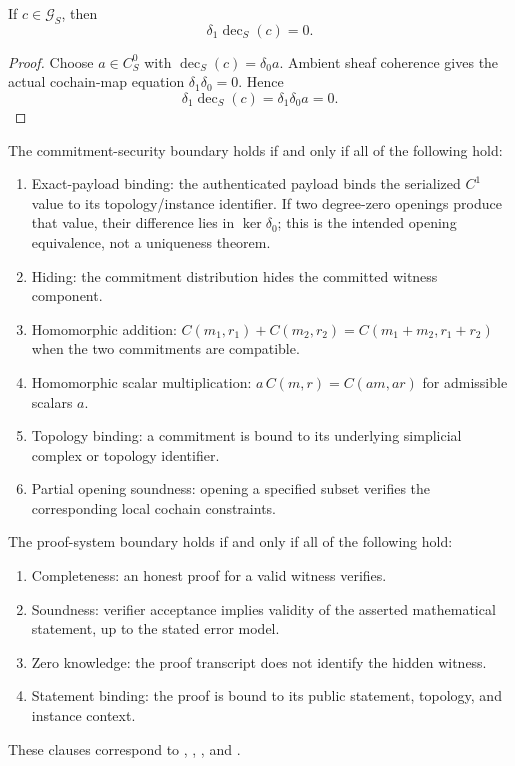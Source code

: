 \begin{proposition}
\label{prop:committed-exact-cochains-are-cocycles}
  If \(c\in\mathcal G_S\), then
  \[
    \delta_1\operatorname{dec}_S(c)=0.
  \]
\end{proposition}

\begin{proof}
  Choose \(a\in C_S^0\) with
  \(\operatorname{dec}_S(c)=\delta_0a\).  Ambient sheaf coherence gives the
  actual cochain-map equation \(\delta_1\delta_0=0\).  Hence
  \[
    \delta_1\operatorname{dec}_S(c)
    =\delta_1\delta_0a
    =0.
  \]
\end{proof}

\begin{definition}\label{def:proof-commitment-assumption-boundary}
  The commitment-security boundary holds if and only if all of the following
  hold:
  \begin{enumerate}[label=(\roman*)]
    \item Exact-payload binding: the authenticated payload binds the serialized
      \(C^1\) value to its topology/instance identifier. If two degree-zero
      openings produce that value, their difference lies in \(\ker\delta_0\);
      this is the intended opening equivalence, not a uniqueness theorem.
    \item Hiding: the commitment distribution hides the committed witness
      component.
    \item Homomorphic addition:
      \(C(m_1,r_1)+C(m_2,r_2)=C(m_1+m_2,r_1+r_2)\) when the two commitments
      are compatible.
    \item Homomorphic scalar multiplication:
      \(a\,C(m,r)=C(am,ar)\) for admissible scalars \(a\).
    \item Topology binding: a commitment is bound to its underlying
      simplicial complex or topology identifier.
    \item Partial opening soundness: opening a specified subset verifies the
      corresponding local cochain constraints.
  \end{enumerate}
  The proof-system boundary holds if and only if all of the following hold:
  \begin{enumerate}[label=(\roman*)]
    \item Completeness: an honest proof for a valid witness verifies.
    \item Soundness: verifier acceptance implies validity of the asserted
      mathematical statement, up to the stated error model.
    \item Zero knowledge: the proof transcript does not identify the hidden
      witness.
    \item Statement binding: the proof is bound to its public statement,
      topology, and instance context.
  \end{enumerate}
  These clauses correspond to
  ,
  ,
  , and .
\end{definition}

